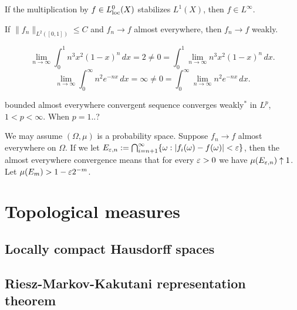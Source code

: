 \documentclass{../../large}
\begin{document}
\begin{prb}
If the multiplication by $f\in L_{\mathrm{loc}}^0(X)$ stabilizes $L^1(X)$, then $f\in L^\infty$.
\end{prb}


\begin{prb}
\end{prb}



If $\|f_n\|_{L^2([0,1])}\le C$ and $f_n\to f$ almost everywhere, then $f_n\to f$ weakly.

\[\lim_{n\to\infty}\int_0^1n^3x^2(1-x)^n\,dx=2\ne0=\int_0^1\lim_{n\to\infty}n^3x^2(1-x)^n\,dx.\]
\[\lim_{n\to\infty}\int_0^\infty n^2e^{-nx}\,dx=\infty\ne0=\int_0^\infty\lim_{n\to\infty}n^2e^{-nx}\,dx.\]




bounded almost everywhere convergent sequence converges weakly$^*$ in $L^p$, $1<p<\infty$.
When $p=1$..?
\begin{pf}
We may assume $(\Omega,\mu)$ is a probability space.
Suppose $f_n\to f$ almost everywhere on $\Omega$.
If we let $E_{\varepsilon,n}:=\bigcap_{i=n+1}^\infty\{\omega:|f_i(\omega)-f(\omega)|<\varepsilon\}$, then the almost everywhere convergence means that for every $\varepsilon>0$ we have $\mu(E_{\varepsilon,n})\uparrow1$.
Let $\mu(E_m)>1-\varepsilon2^{-m}$.
\end{pf}













\chapter{Topological measures}

\section{Locally compact Hausdorff spaces}

\begin{prb}
\end{prb}





\section{Riesz-Markov-Kakutani representation theorem}
\end{document}
